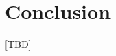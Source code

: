 \documentclass{sig-alternate-05-2015}
\begin{document}


\section{Conclusion}
\label{sec:conclusion}
[TBD]



\end{document}
